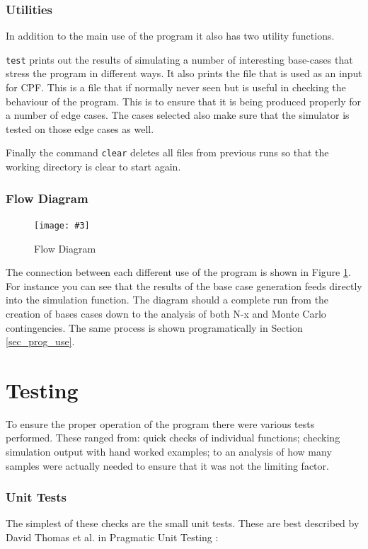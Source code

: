 \documentclass[a4paper,oneside,12pt]{report}
\newcommand{\image}[3] {
  \begin{figure}
    \begin{center}
      \texttt{[image: \#3]}
      \caption{#2}
      \label{#1}
    \end{center}
  \end{figure}
}
\begin{document}
\subsubsection{Utilities}

In addition to the main use of the program it also has two utility
functions.

\texttt{test} prints out the results of simulating a number of interesting base-cases that stress the program in different ways. It also prints the file that is used as an input for CPF. This is a file that if normally never seen but is useful in checking the behaviour of the program. This is to ensure that it is being produced properly for a number of edge cases. The cases selected also make sure that the simulator is tested on those edge cases as well.

Finally the command \texttt{clear} deletes all files from previous runs so that the working directory is clear to start again.

\subsubsection{Flow Diagram}

\image{imgflow}{Flow Diagram}{flow.png}

The connection between each different use of the program is shown in Figure \ref{imgflow}. For instance you can see that the results of the base case generation feeds directly into the simulation function. The diagram should a complete run from the creation of bases cases down to the analysis of both N-x and Monte Carlo contingencies. The same process is shown programatically in Section \ref{sec_prog_use}. 

\section{Testing}

To ensure the proper operation of the program there were various tests performed. These ranged from: quick checks of individual functions; checking simulation output with hand worked examples; to an analysis of how many samples were actually needed to ensure that it was not the limiting factor.

\subsubsection{Unit Tests}

The simplest of these checks are the small unit tests. These are best
described by David Thomas et al. in Pragmatic Unit Testing \cite{Hunt2007}:
\end{document}
